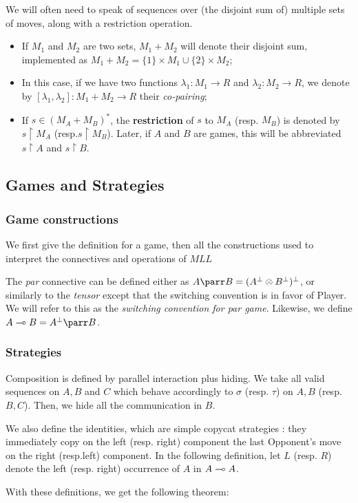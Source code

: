 We will often need to speak of sequences over (the disjoint sum of)
multiple sets of moves, along with a restriction operation.

\begin{itemize}
\tightlist
\item
  If \(M_1\) and \(M_2\) are two sets, \(M_1 + M_2\) will denote their
  disjoint sum, implemented as
  \(M_1 + M_2 = \{1\}\times M_1 \cup \{2\}\times M_2\);
\item
  In this case, if we have two functions \(\lambda_1:M_1 \to R\) and
  \(\lambda_2:M_2\to R\), we denote by
  \([\lambda_1,\lambda_2]:M_1 + M_2 \to R\) their \emph{co-pairing};
\item
  If \(s\in (M_A + M_B)^*\), the \textbf{restriction} of \(s\) to
  \(M_A\) (resp. \(M_B\)) is denoted by \(s\upharpoonright M_A\)
  (resp.\(s \upharpoonright M_B\)). Later, if \(A\) and \(B\) are games,
  this will be abbreviated \(s\upharpoonright A\) and
  \(s\upharpoonright B\).
\end{itemize}

\subsection{Games and Strategies}\label{games-and-strategies}

\subsubsection{Game constructions}\label{game-constructions}

We first give the definition for a game, then all the constructions used
to interpret the connectives and operations of \(MLL\)

The \emph{par} connective can be defined either as
\(A\parr B = (A^\bot \tens B^\bot)^\bot\), or similarly to the
\emph{tensor} except that the switching convention is in favor of
Player. We will refer to this as the \emph{switching convention for par
game}. Likewise, we define \(A\limp B = A
^\bot\parr B\).

\subsubsection{Strategies}\label{strategies}

Composition is defined by parallel interaction plus hiding. We take all
valid sequences on \(A, B\) and \(C\) which behave accordingly to
\(\sigma\) (resp. \(\tau\)) on \(A, B\) (resp. \(B,C\)). Then, we hide
all the communication in \(B\).

We also define the identities, which are simple copycat strategies :
they immediately copy on the left (resp. right) component the last
Opponent's move on the right (resp.left) component. In the following
definition, let \(L\) (resp. \(R\)) denote the left (resp. right)
occurrence of \(A\) in \(A\multimap A\).

With these definitions, we get the following theorem:

